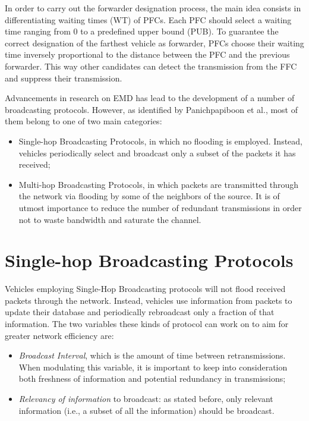 	
	In order to carry out the forwarder designation process, the main idea consists in differentiating waiting times (WT) of PFCs. Each PFC should select a waiting time ranging from 0 to a predefined upper bound (PUB). To guarantee the correct designation of the farthest vehicle as forwarder, PFCs choose their waiting time inversely proportional to the distance between the PFC and the previous forwarder. This way other candidates can detect the transmission from the FFC and suppress their transmission.
	
	Advancements in research on EMD has lead to the development of a number of broadcasting protocols. However, as identified by {Panichpapiboon} et al.\cite{5989903}, most of them belong to one of two main categories:
	\begin{itemize}
		\item Single-hop Broadcasting Protocols, in which no flooding is employed. Instead, vehicles periodically select and broadcast only a subset of the packets it has received;
		\item Multi-hop Broadcasting Protocols, in which packets are transmitted through the network via flooding by some of the neighbors of the source. It is of utmost importance to reduce the number of redundant transmissions in order not to waste bandwidth and saturate the channel.
	\end{itemize}
		
	\section{Single-hop Broadcasting Protocols}
		Vehicles employing Single-Hop Broadcasting protocols will not flood received packets through the network. Instead, vehicles use information from packets to update their database and periodically rebroadcast only a fraction of that information. The two variables these kinds of protocol can work on to aim for greater network efficiency are:
		\begin{itemize}
			\item \textit{Broadcast Interval}, which is the amount of time between retransmissions. When modulating this variable, it is important to keep into consideration both freshness of information and potential redundancy in transmissions;
			\item \textit{Relevancy of information} to broadcast: as stated before, only relevant information (i.e., a subset of all the information) should be broadcast.
		\end{itemize}
		
